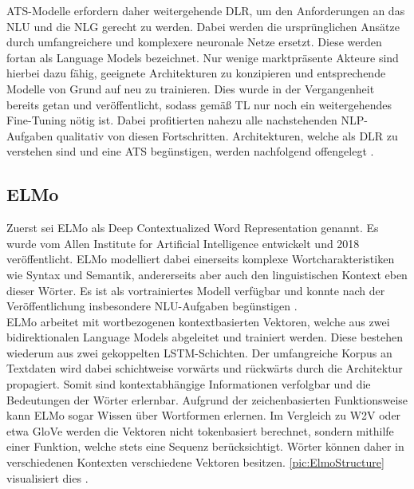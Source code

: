 \noindent
\ac{ATS}-Modelle erfordern daher weitergehende \ac{DLR}, um den Anforderungen an das \ac{NLU} und die \ac{NLG} gerecht zu werden. Dabei werden die ursprünglichen Ansätze durch umfangreichere und komplexere neuronale Netze ersetzt. Diese werden fortan als Language Models bezeichnet. Nur wenige marktpräsente Akteure sind hierbei dazu fähig, geeignete Architekturen zu konzipieren und entsprechende Modelle von Grund auf neu zu trainieren. Dies wurde in der Vergangenheit bereits getan und veröffentlicht, sodass gemäß \ac{TL} nur noch ein weitergehendes Fine-Tuning nötig ist. Dabei profitierten nahezu alle nachstehenden \ac{NLP}-Aufgaben qualitativ von diesen Fortschritten. Architekturen, welche als \ac{DLR} zu verstehen sind und eine \ac{ATS} begünstigen, werden nachfolgend offengelegt \cite[S.~25]{NIT19}.


\subsection{ELMo}
\noindent
Zuerst sei \ac{ELMo} als Deep Contextualized Word Representation genannt. Es wurde vom Allen Institute for Artificial Intelligence entwickelt und 2018 veröffentlicht. \ac{ELMo} modelliert dabei einerseits komplexe Wortcharakteristiken wie Syntax und Semantik, andererseits aber auch den linguistischen Kontext eben dieser Wörter. Es ist als vortrainiertes Modell verfügbar und konnte nach der Veröffentlichung insbesondere \ac{NLU}-Aufgaben begünstigen \cite[S.~1]{PET18}.\\

\noindent
\ac{ELMo} arbeitet mit wortbezogenen kontextbasierten Vektoren, welche aus zwei bidirektionalen Language Models abgeleitet und trainiert werden. Diese bestehen wiederum aus zwei gekoppelten \ac{LSTM}-Schichten. Der umfangreiche Korpus an Textdaten wird dabei schichtweise vorwärts und rückwärts durch die Architektur propagiert. Somit sind kontextabhängige Informationen verfolgbar und die Bedeutungen der Wörter erlernbar. Aufgrund der zeichenbasierten Funktionsweise kann \ac{ELMo} sogar Wissen über Wortformen erlernen. Im Vergleich zu \ac{W2V} oder etwa \ac{GloVe} werden die Vektoren nicht tokenbasiert berechnet, sondern mithilfe einer Funktion, welche stets eine Sequenz berücksichtigt. Wörter können daher in verschiedenen Kontexten verschiedene Vektoren besitzen. \autoref{pic:ElmoStructure} visualisiert dies \cite[S.~2-3]{PET18}.

